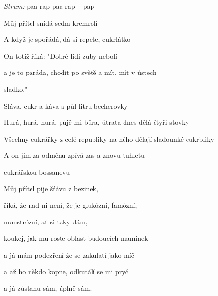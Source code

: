 \begin{song}



\textit{Strum:} paa rap paa rap -- pap

\large


\large

\bigskip

Můj přítel  snídá sedm kremrolí  \par
A když je spořádá, dá si repete, cukrlátko  \par
On totiž říká:  "Dobré lidi zuby nebolí  \par
a je to paráda, chodit po světě a mít, mít v ústech \par
{}sladko."    \par

\bigskip

\begin{chorusboxwide}
 \par \smallskip
{}Sláva,  cukr a káva a půl litru becherovky \par
{}Hurá, hurá, hurá, půjč mi bůra, útrata dnes dělá čtyři stovky \par
Všechny cukrářky z celé  republiky na něho dělají slaďounké cukrbliky \par
A on jim za odměnu zpívá zas a znovu tuhletu  \par
cukrářskou bossanovu    \par
\end{chorusboxwide}

\bigskip

Můj přítel  pije šťávu z bezinek,  \par
říká, že nad ni není, že je glukózní, famózní, \par
{}monstrózní, ať si taky dám, \par
koukej, jak mu roste  oblast budoucích maminek  \par
a já mám podezření že se zakulatí jako míč \par
a až ho někdo kopne, odkutálí se mi pryč \par
a já zůstanu sám,  úplně sám.  \par


\end{song}
